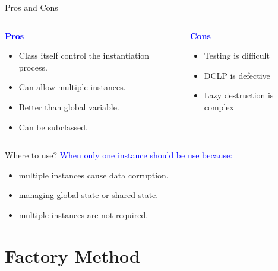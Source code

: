 \documentclass[13pt]{beamer}
\begin{document}
\begin{frame}{Pros and Cons}
\begin{columns}[T]
\begin{column}{.45\textwidth}
	\begin{center}
	\textcolor{blue}{\textbf{Pros}}
	\end{center}
	\begin{itemize}
		\setlength\itemsep{1em}
		\item Class itself control the instantiation process.
		\item Can allow multiple instances.
		\item Better than global variable.
		\item Can be subclassed.
	\end{itemize}
\end{column}
\begin{column}{.45\textwidth}
	\begin{center}
	\textcolor{blue}{\textbf{Cons}}
	\end{center}
		\begin{itemize}
		\setlength\itemsep{1em}
		\item Testing is difficult
		\item DCLP is defective
		\item Lazy destruction is complex
	\end{itemize}
\end{column}
\end{columns}
\end{frame}

\begin{frame}{Where to use?}
	\textcolor{blue}{When only one instance should be use because:}	
	\begin{itemize}
		\setlength\itemsep{1em}
		\item multiple instances cause data corruption.
		\item managing global state or shared state.
		\item multiple instances are not required.
	\end{itemize}
\end{frame}
\section{Factory Method}
\end{document}
